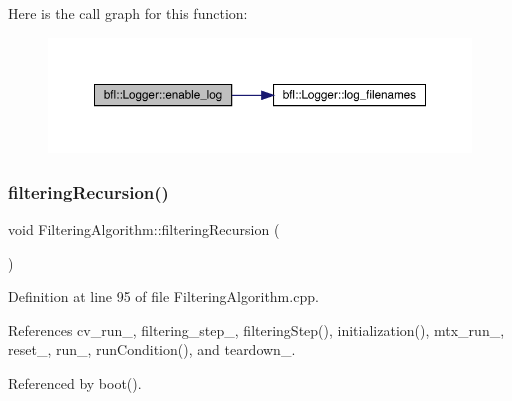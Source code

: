 Here is the call graph for this function\+:
\nopagebreak
\begin{figure}[H]
\begin{center}
\leavevmode
\includegraphics[width=350pt]{classbfl_1_1Logger_ae94b97b6e8d7902e8ce048384813122e_cgraph}
\end{center}
\end{figure}
\mbox{\label{classbfl_1_1FilteringAlgorithm_a139fe290f73939e72c88cb43c8ef7544}} 
\subsubsection{\texorpdfstring{filtering\+Recursion()}{filteringRecursion()}}
{\footnotesize\ttfamily void Filtering\+Algorithm\+::filtering\+Recursion (\begin{DoxyParamCaption}{ }\end{DoxyParamCaption})\hspace{0.3cm}{\ttfamily [private]}}



Definition at line 95 of file Filtering\+Algorithm.\+cpp.



References cv\+\_\+run\+\_\+, filtering\+\_\+step\+\_\+, filtering\+Step(), initialization(), mtx\+\_\+run\+\_\+, reset\+\_\+, run\+\_\+, run\+Condition(), and teardown\+\_\+.



Referenced by boot().

